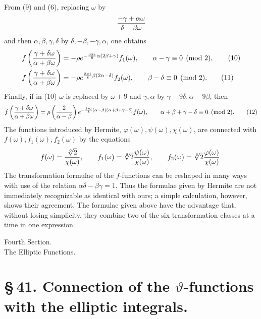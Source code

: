 \documentclass[11pt]{article}
\newcommand{\Jac}[2]{\left(\frac{#1}{#2}\right)}
\begin{document}
From (9) and (6), replacing $\omega$ by
\[
{-\gamma+
\alpha\omega\over\delta-
\beta\omega}
\]
and then $\alpha,\beta,\gamma,\delta$ by $\delta,-\beta,-\gamma,\alpha$, one obtains
\begin{align}
f\left({\gamma+
\delta\omega\over\alpha+
\beta\omega}\right)
&=-\rho e^{-\frac{3\pi i}{8}\alpha(2\beta+
\gamma)}f_1(\omega),
\qquad \alpha-
\gamma\equiv0\pmod2, \tag{10}\\
f\left({\gamma+
\delta\omega\over\alpha+
\beta\omega}\right)
&=-\rho e^{\frac{3\pi i}{8}\beta(2\alpha-
\delta)}f_2(\omega),
\qquad \beta-
\delta\equiv0\pmod2. \tag{11}
\end{align}
Finally, if in (10) $\omega$ is replaced by $\omega+9$ and $\gamma,
\alpha$ by $\gamma-9\delta,
\alpha-9\beta$, then
\begin{equation}
f\left({\gamma+
\delta\omega\over\alpha+
\beta\omega}\right)
=\rho\Jac{2}{\alpha-
\beta}e^{-\frac{3\pi i}{8}(\alpha-
\beta)(\alpha+
\beta+
\gamma-
\delta)}f(\omega),
\qquad \alpha+
\beta+
\gamma-
\delta\equiv0\pmod2. 
\tag{12}
\end{equation}
The functions introduced by Hermite, $\varphi(\omega),\psi(\omega),\chi(\omega)$, are connected with $f(\omega),f_1(\omega),f_2(\omega)$ by the equations
\[
f(\omega)={\sqrt[6]{2}\over\chi(\omega)},
\qquad
f_1(\omega)=\sqrt[6]{2}{\psi(\omega)\over\chi(\omega)},
\qquad
f_2(\omega)=\sqrt[6]{2}{\varphi(\omega)\over\chi(\omega)}.
\]
The transformation formulae of the $f$-functions can be reshaped in many ways with use of the relation $\alpha\delta-\beta\gamma=1$. Thus the formulae given by Hermite are not immediately recognizable as identical with ours; a simple calculation, however, shows their agreement. The formulae given above have the advantage that, without losing simplicity, they combine two of the six transformation classes at a time in one expression.

\begin{center}
{\large Fourth Section.}\\[0.7em]
{\Large The Elliptic Functions.}
\end{center}

\section*{\S\,41. Connection of the $\vartheta$-functions with the elliptic integrals.}
\end{document}
